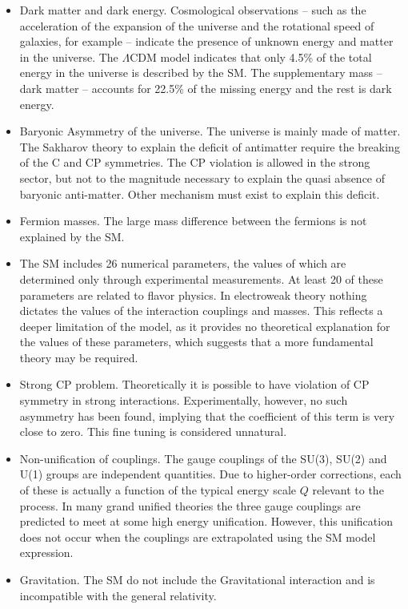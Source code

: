 \begin{itemize}
  \item Dark matter and dark energy. Cosmological observations -- such as the acceleration of the expansion of the universe and the rotational speed of galaxies, for example -- indicate the presence of unknown energy and matter in the universe. The $\Lambda$CDM model \cite{bull_beyond_2016, perivolaropoulos_challenges_2022} indicates that only 4.5\% of the total energy in the universe is described by the SM. The supplementary mass -- dark matter -- accounts for 22.5\% of the missing energy and the rest is dark energy.
  \item Baryonic Asymmetry of the universe. The universe is mainly made of matter. The Sakharov theory \cite{sakharov_violation_1991} to explain the deficit of antimatter require the breaking of the C and CP symmetries. The CP violation is allowed in the strong sector, but not to the magnitude necessary to explain the quasi absence of baryonic anti-matter. Other mechanism must exist to explain this deficit.
  \item Fermion masses. The large mass difference between the fermions is not explained by the SM.
  \item The SM includes 26 numerical parameters, the values of which are determined only through experimental measurements. At least 20 of these parameters are related to flavor physics. In electroweak theory nothing dictates the values of the interaction couplings and masses. This reflects a deeper limitation of the model, as it provides no theoretical explanation for the values of these parameters, which suggests that a more fundamental theory may be required.
  \item Strong CP problem. Theoretically it is possible to have violation of CP symmetry in strong interactions. Experimentally, however, no such asymmetry has been found, implying that the coefficient of this term is very close to zero. This fine tuning is considered unnatural.
  \item Non-unification of couplings. The gauge couplings of the SU(3), SU(2) and U(1) groups are independent quantities. Due to higher-order corrections, each of these is actually a function of the typical energy scale $Q$ relevant to the process. In many grand unified theories the three gauge couplings are predicted to meet at some high energy unification. However, this unification does not occur when the couplings are extrapolated using the SM model expression.
  \item Gravitation. The SM do not include the Gravitational interaction and is incompatible with the general relativity.
\end{itemize}


